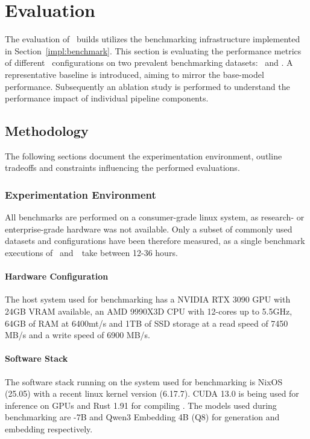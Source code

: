 \section{Evaluation}

The evaluation of \Natural~builds utilizes the benchmarking infrastructure
implemented in Section~\ref{impl:benchmark}. This section is evaluating the
performance metrics of different \Natural~configurations on two prevalent
benchmarking datasets: \Spider~and \Bird. A representative baseline is
introduced, aiming to mirror the base-model performance. Subsequently an
ablation study is performed to understand the performance impact of individual
pipeline components.

\subsection{Methodology}

The following sections document the experimentation environment, outline
tradeoffs and constraints influencing the performed evaluations.

\subsubsection{Experimentation Environment}

All benchmarks are performed on a consumer-grade linux system, as research- or
enterprise-grade hardware was not available. Only a subset of commonly used
datasets and configurations have been therefore measured, as a single benchmark
executions of \Spider~and~\Bird~take between 12-36 hours. 

\paragraph{Hardware Configuration}

The host system used for benchmarking has a NVIDIA RTX 3090 GPU with 24GB VRAM
available, an AMD 9990X3D CPU with 12-cores up to 5.5GHz, 64GB of RAM at
6400mt/s and 1TB of SSD storage at a read speed of 7450 MB/s and a write speed
of 6900 MB/s.

\paragraph{Software Stack}

The software stack running on the system used for benchmarking is NixOS (25.05)
with a recent linux kernel version (6.17.7). CUDA 13.0 is being used for
inference on GPUs and Rust 1.91 for compiling \Natural. The models used during
benchmarking are \OmniSQL-7B and Qwen3 Embedding 4B (Q8) for generation
and embedding respectively.

